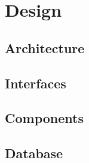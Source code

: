 \chapter{Design}\label{part:design}

\section{Architecture}
 
\section{Interfaces}
 
\section{Components}
 
\section{Database}
